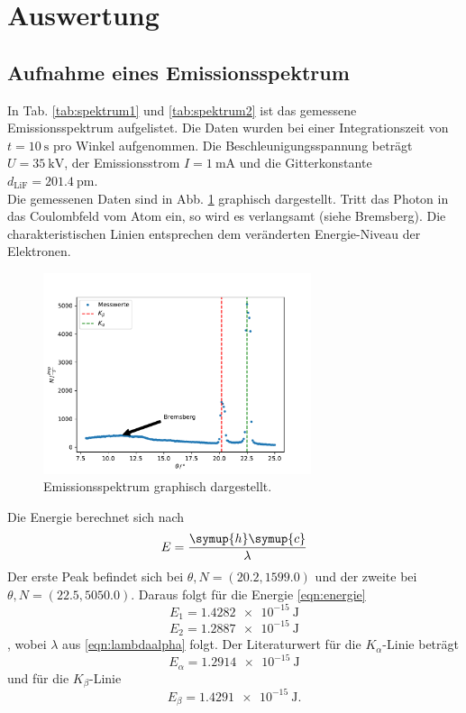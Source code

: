 \section{Auswertung}
\label{sec:Auswertung}
\subsection{Aufnahme eines Emissionsspektrum}
\label{sec:spektrum}
In Tab. \ref{tab:spektrum1} und \ref{tab:spektrum2} ist das gemessene Emissionsspektrum aufgelistet.
Die Daten wurden bei einer Integrationszeit von $t=\SI{10}{\second}$ pro Winkel aufgenommen.
Die Beschleunigungsspannung beträgt $U=\SI{35}{\kilo\volt}$, der Emissionsstrom $I=\SI{1}{\milli\ampere}$ und die Gitterkonstante $d_\text{LiF}=\SI{201.4}{\pico\metre}$.
\\
Die gemessenen Daten sind in Abb. \ref{fig:spektrum} graphisch dargestellt.
Tritt das Photon in das Coulombfeld vom Atom ein, so wird es verlangsamt (siehe Bremsberg).
Die charakteristischen Linien entsprechen dem veränderten Energie-Niveau der Elektronen.
\begin{figure}
    \centering
    \includegraphics[width=0.7\textwidth]{content/data/plot.pdf}
    \caption{Emissionsspektrum graphisch dargestellt. \cite{numpy}}
    \label{fig:spektrum}
\end{figure}
Die Energie berechnet sich nach
\begin{equation}
    E = \frac{\symup{h}\symup{c}}{\lambda}
    \label{eqn:energie}
\end{equation}
Der erste Peak befindet sich bei $\theta, N = (20.2, 1599.0)$ und der zweite bei $\theta, N = (22.5, 5050.0)$.
Daraus folgt für die Energie \autoref{eqn:energie}
\begin{equation*}
    E_1 = \SI{1.4282e-15}{\joule}
\end{equation*}
\begin{equation*}
    E_2 = \SI{1.2887e-15}{\joule}
\end{equation*}
, wobei $\lambda$ aus \autoref{eqn:lambdaalpha} folgt.
Der Literaturwert für die $K_\alpha$-Linie \cite{klinie} beträgt
\begin{equation*}
    E_\alpha = \SI{1.2914e-15}{\joule}
\end{equation*}
und für die $K_\beta$-Linie \cite{klinie}
\begin{equation*}
     E_\beta = \SI{1.4291e-15}{\joule} .
\end{equation*}
